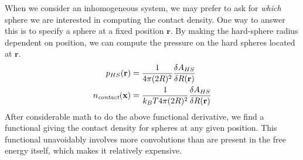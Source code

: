 \documentclass[letterpaper,twocolumn,amsmath,amssymb,jcp,10pt,aip]{revtex4-1}
\newcommand{\xx}{\textbf{x}}
\begin{document}
When we consider an inhomogeneous system, we may prefer to ask for
\emph{which} sphere we are interested in computing the contact
density.  One way to answer this is to specify a sphere at a fixed
position $\mathbf{r}$.  By making the hard-sphere radius dependent on
position, we can compute the pressure on the hard spheres located at
$\mathbf{r}$.
\begin{align}
  p_{HS}(\mathbf{r}) &= \frac{1}{4\pi (2R)^2} \frac{\delta
    A_{HS}}{\delta R(\mathbf{r})} \\
  \ncontact(\xx) &= \frac{1}{k_BT 4\pi (2R)^2} \frac{\delta
    A_{HS}}{\delta R(\mathbf{r})}
\end{align}
After considerable math to do the above functional derivative, we find
a functional giving the contact density for spheres at any given
position.  This functional unavoidably involves more convolutions than
are present in the free energy itself, which makes it relatively
expensive.
\end{document}
